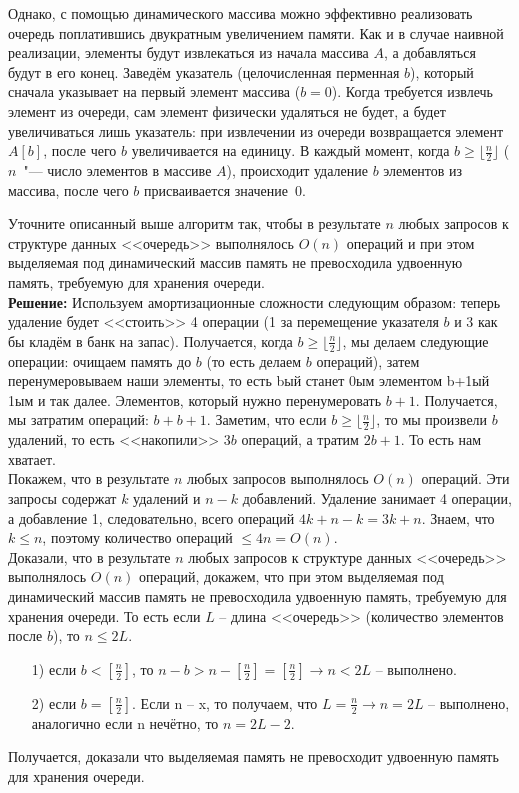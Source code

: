 \documentclass[a4paper,12pt]{article} %
\begin{document}
Однако, с помощью динамического массива можно эффективно реализовать очередь поплатившись двукратным увеличением памяти.
Как и в случае наивной реализации, элементы будут извлекаться из начала массива $A$, а добавляться будут в его конец. Заведём указатель (целочисленная перменная $b$), который сначала указывает на первый элемент массива ($b=0$). Когда требуется извлечь элемент из очереди, сам элемент физически удаляться не будет, а будет увеличиваться лишь указатель: при извлечении из очереди возвращается элемент $A[b]$, после чего $b$ увеличивается на единицу. В каждый момент, когда $b \geq \lfloor \frac{n}{2} \rfloor$ ($n$~"--- число элементов в массиве $A$), происходит удаление $b$ элементов из массива, после чего $b$ присваивается значение~$0$.
 
Уточните описанный выше алгоритм так, чтобы в результате $n$ любых запросов к структуре данных <<очередь>> выполнялось $O(n)$ операций и при этом выделяемая под динамический массив память не превосходила удвоенную память, требуемую для хранения очереди.\\


\textbf{Решение:} Используем амортизационные сложности следующим образом: теперь удаление будет <<стоить>> 4 операции (1 за перемещение указателя $ b $ и 3 как бы кладём в банк на запас). Получается, когда $b \geq \lfloor \frac{n}{2} \rfloor$, мы делаем следующие операции: очищаем память до $ b $ (то есть делаем $ b $ операций), затем перенумеровываем наши элементы, то есть bый станет 0ым элементом b+1ый 1ым и так далее. Элементов, который нужно перенумеровать $ b + 1 $. Получается, мы затратим операций: $ b+b+1 $. Заметим, что если $b \geq \lfloor \frac{n}{2} \rfloor$, то мы произвели $ b $ удалений, то есть <<накопили>> $ 3b $ операций, а тратим $ 2b + 1$. То есть нам хватает.\\

Покажем, что в результате $n$ любых запросов выполнялось $O(n)$ операций. Эти запросы содержат $ k $ удалений и $ n - k $ добавлений. Удаление занимает 4 операции, а добавление 1, следовательно, всего операций $ 4k + n - k = 3k + n $. Знаем, что $ k\leq n $, поэтому количество операций $ \leq 4n = O(n)$.\\

Доказали, что в результате $n$ любых запросов к структуре данных <<очередь>> выполнялось $O(n)$ операций, докажем, что при этом выделяемая под динамический массив память не превосходила удвоенную память, требуемую для хранения очереди. То есть если $ L $ -- длина <<очередь>> (количество элементов после $ b $), то $ n \leq 2L $.\\
\begin{itemize}
\item[1) ] если $ b < \left[\frac{n}{2} \right] $, то $ n - b > n - \left[\frac{n}{2} \right] = \left[\frac{n}{2} \right] \longrightarrow n < 2L$ -- выполнено.
\item[2) ] если $ b = \left[\frac{n}{2} \right] $. Если n -- x, то получаем, что $ L = \frac{n}{2} \longrightarrow n = 2L $ -- выполнено, аналогично если n нечётно, то $ n = 2L - 2$.
\end{itemize}
Получается, доказали что выделяемая память не превосходит удвоенную память для хранения очереди.
\end{document}
